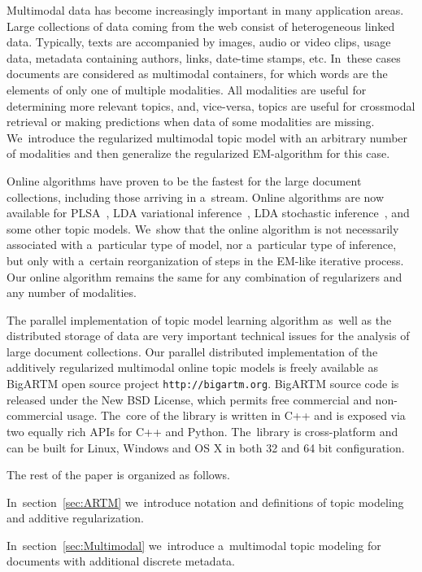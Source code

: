 \documentclass{sig-alternate}
\begin{document}
Multimodal data has become increasingly important in many application areas.
Large collections of data coming from the web %
consist of heterogeneous linked data.
Typically, texts are accompanied by images, audio or video clips, usage data,
metadata containing authors, links, date-time stamps, etc.
In~these cases documents are considered as multimodal containers,
for which words are the elements of only one of multiple modalities.
All modalities are useful for determining more relevant topics,
and, vice-versa,
topics are useful for crossmodal retrieval or making predictions when data of some modalities are missing.
We~introduce the regularized multimodal topic model
with an arbitrary number of modalities
and then generalize the regularized EM-algorithm for this case.

Online algorithms have proven to be the fastest
for the large document collections, including those arriving in a~stream.
Online algorithms are now available for
PLSA~\cite{bassiou14online},
LDA variational inference~\cite{hoffman10online},
LDA stochastic inference~\cite{mimno12sparse}, and
some other topic models.
We~show that the online algorithm is not necessarily associated with
a~particular type of model, nor
a~particular type of inference,
but only with a~certain reorganization of steps in the EM-like iterative process.
Our online algorithm remains the same
for any combination of regularizers and any number of modalities.

The parallel implementation of topic model learning algorithm
as~well as the distributed storage of data
are very important technical issues
for the analysis of large document collections.
Our parallel distributed implementation of the additively regularized multimodal online topic models
is freely available as BigARTM open source project
\texttt{http://bigartm.org}.
BigARTM source code is released under the New BSD License, which permits free commercial and non-commercial usage.
The~core of the library is written in C++ and is exposed via two equally rich APIs for C++ and Python.
The~library is cross-platform and can be built for Linux, Windows and OS X in both 32 and 64 bit configuration.

The rest of the paper is organized as follows.

In~section~\ref{sec:ARTM}
we~introduce notation and definitions of topic modeling and additive regularization.

In~section~\ref{sec:Multimodal}
we~introduce a~multimodal topic modeling for documents with additional discrete metadata.
\end{document}
